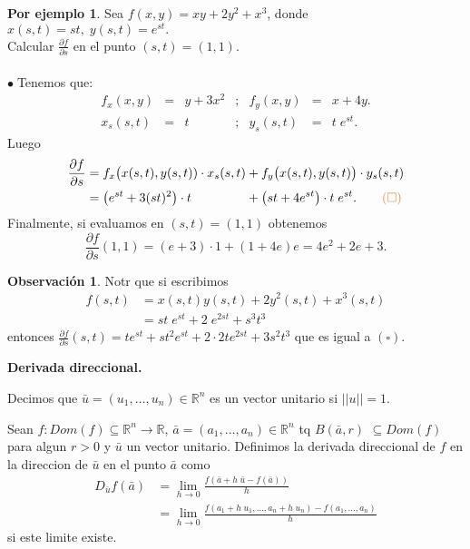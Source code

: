 \documentclass{article}
\theoremstyle{definition}
\newtheorem*{obs}{Observación}
\newtheorem*{ej}{Por ejemplo}
\theoremstyle{remark}
\newcommand\bl{$\bullet\;$}
\begin{document}
\begin{ej}
  Sea $f(x,y)=xy+2y^2+x^3$, donde \mbox{$x(s,t)=st, \; y(s,t)=e^{st}.$} \\Calcular $\frac{\partial f }{\partial s}$ en el punto $(s,t)=(1,1)$. \\\\
  \bl Tenemos que:  $$\begin{array}{lclclcl}
      f_x(x,y) & = & y+3x^2 & ; & f_y(x,y) & = & x+4y. \\
      x_s(s,t) & = & t & ; & y_s(s,t) & = &  t \; e^{st}.
      \end{array}$$ Luego \[
  \begin{alignedat}{10}
  \frac{\partial f}{\partial s} & = f_x \big(x(s,t),y(s,t)) \cdot x_s(s,t) && + f_y \big(x(s,t),y(s,t)\big) \cdot y_s(s,t) \\ 
                                & = \big(e^{st}+3(st)^2\big) \cdot t && + \big(st+4e^{st}\big) \cdot t\; e^{st}. \quad \quad \textcolor{rojop2}{(\square)}\end{alignedat}
      \]Finalmente, si evaluamos en $(s,t)=(1,1)$ obtenemos \[
      \frac{\partial f}{\partial s}(1,1)=(e+3)\cdot 1+(1+4e)e = 4e^2+2e+3.
    \]
                                       \end{ej}
\begin{obs}
  Notr que si escribimos \[ 
    \begin{aligned}
      f(s,t) & = x(s,t)y(s,t)+2y^2(s,t)+x^3(s,t) \\
             & =st \; e^{st} + 2 \; e^{2st} + s^3t^3
    \end{aligned}
  \] entonces $\frac{\partial f }{\partial s}(s,t)=te^{st}+st^2e^{st}+2\cdot2te^{2st}+3s^2t^3$ que es igual a \textcolor{rojop2}{$(\square)$}.
\end{obs}\pagebreak
\begin{center}
\textbf{Derivada direccional.}
\end{center}
\begin{defi}
  Decimos que $\bar{u}=(u_1,\dots,u_n) \in \mathbb{R}^n$ es un vector unitario si $||u||=1$. 
\end{defi}
\begin{defi}
  Sean $f: Dom(f) \subseteq \mathbb{R}^n \to \mathbb{R}$, $\bar{a}=(a_1,\dots,a_n) \in \mathbb{R}^n$ tq $B(\bar{a},r)$ $\subseteq Dom(f)$ para algun $r>0$ y $\bar{u}$ un vector unitario. Definimos la derivada direccional de $f$ en la direccion de $\bar{u}$ en el punto $\bar{a}$ como \[
    \begin{aligned}
      D_{\bar{u}}f(\bar{a}) & = \lim_{h\to0}{\frac{f(\bar{a}+h\;\bar{u}-f(\bar{a}))}{h}} \\
                            & = \lim_{h \to 0}{\frac{f(a_1+h\;u_1,\dots,a_n+h\;u_n)-f(a_1,\dots,a_n)}{h}} 
  \end{aligned}\]si este limite existe.
\end{defi}
\end{document}
